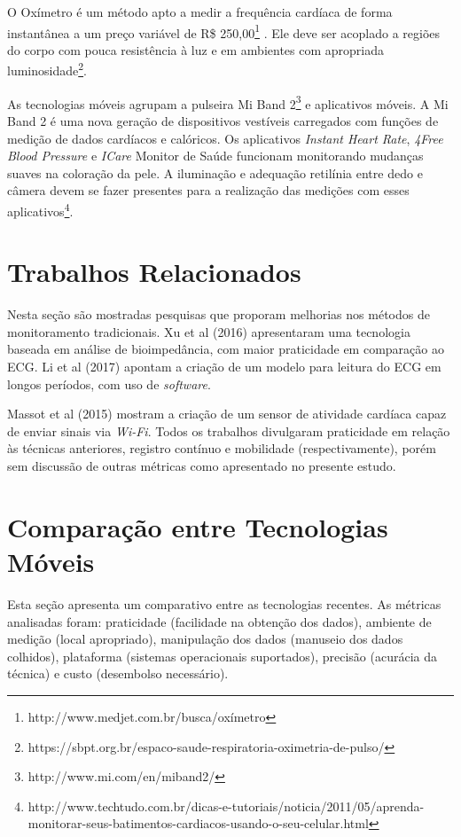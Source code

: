 \documentclass[12pt]{article}
\begin{document}
O Oxímetro é um método apto a medir a frequência cardíaca de forma instantânea a um preço variável de R\$ 250,00\footnote{http://www.medjet.com.br/busca/oxímetro} \cite{garbey} . Ele deve ser acoplado a regiões do corpo com pouca resistência à luz e em ambientes com apropriada luminosidade\footnote{https://sbpt.org.br/espaco-saude-respiratoria-oximetria-de-pulso/}.

As tecnologias móveis agrupam a pulseira Mi Band 2\footnote{ http://www.mi.com/en/miband2/} e aplicativos móveis. A Mi Band 2 é uma nova geração de dispositivos vestíveis carregados com funções de medição de dados cardíacos e calóricos. Os aplicativos \textit{Instant Heart Rate}, \textit{4Free Blood Pressure} e \textit{ICare} Monitor de Saúde funcionam monitorando mudanças suaves na coloração da pele. A iluminação e adequação retilínia entre dedo e câmera devem se fazer presentes para a realização das medições com esses aplicativos\footnote{http://www.techtudo.com.br/dicas-e-tutoriais/noticia/2011/05/aprenda-monitorar-seus-batimentos-cardiacos-usando-o-seu-celular.html}.

\section{Trabalhos Relacionados}

Nesta seção são mostradas pesquisas que proporam melhorias nos métodos de monitoramento tradicionais. Xu et al (2016) apresentaram uma tecnologia baseada em análise de bioimpedância, com maior praticidade em comparação ao ECG. Li et al (2017) apontam a criação de um modelo para leitura do ECG em longos períodos, com uso de \textit{software}. 

Massot et al (2015) mostram a criação de um sensor de atividade cardíaca capaz de enviar sinais via \textit{Wi-Fi}. Todos os trabalhos divulgaram praticidade em relação às técnicas anteriores, registro contínuo e mobilidade (respectivamente), porém sem discussão de outras métricas como apresentado no presente estudo.

\section{Comparação entre Tecnologias Móveis}\label{sec:figs}

Esta seção apresenta um comparativo entre as tecnologias recentes. As métricas analisadas foram: praticidade (facilidade na obtenção dos dados), ambiente de medição (local apropriado), manipulação dos dados (manuseio dos dados colhidos), plataforma (sistemas operacionais suportados), precisão (acurácia da técnica) e custo (desembolso necessário).
\end{document}
